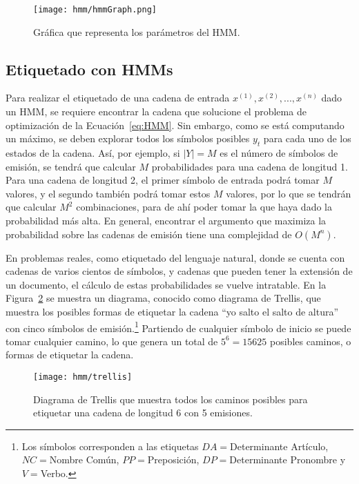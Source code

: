 \begin{figure}
 \centering
 \texttt{[image: hmm/hmmGraph.png]}
 \caption{Gráfica que representa los parámetros del HMM.}\label{Fig:hmmGraph}
\end{figure}





\subsection{Etiquetado con HMMs}

Para realizar el etiquetado de una cadena de entrada $x^{(1)}, x^{(2)},...,x^{(n)}$ dado un HMM, se requiere encontrar la cadena que solucione el problema de optimización de la Ecuación~\ref{eq:HMM}. Sin embargo, como se está computando un máximo, se deben explorar todos los símbolos posibles $y_t$ para cada uno de los estados de la cadena. Así, por ejemplo, si $|Y| = M$ es el número de símbolos de emisión, se tendrá que calcular $M$ probabilidades para una cadena de longitud 1. Para una cadena de longitud 2, el primer símbolo de entrada podrá tomar $M$ valores, y el segundo también podrá tomar estos $M$ valores, por lo que se tendrán que calcular $M^2$ combinaciones, para de ahí poder tomar la que haya dado la probabilidad más alta. En general, encontrar el argumento que maximiza la probabilidad sobre las cadenas de emisión tiene una complejidad de $O(M^n)$.

En problemas reales, como etiquetado del lenguaje natural, donde se cuenta con cadenas de varios cientos de símbolos, y cadenas que pueden tener la extensión de un documento, el cálculo de estas probabilidades se vuelve intratable. En la Figura~\ref{Fig:Trellis} se muestra un diagrama, conocido como diagrama de Trellis, que muestra los posibles formas de etiquetar la cadena ``yo salto el salto de altura'' con cinco símbolos de emisión.\footnote{Los símbolos corresponden a las etiquetas $DA=$Determinante Artículo, $NC=$Nombre Común, $PP=$Preposición, $DP=$Determinante Pronombre y $V=$Verbo.} Partiendo de cualquier símbolo de inicio se puede tomar cualquier camino, lo que genera un total de $5^6=15 625$ posibles caminos, o formas de etiquetar la cadena.


\begin{figure}
    \centering
    \texttt{[image: hmm/trellis]}
    \caption{Diagrama de Trellis que muestra todos los caminos posibles para etiquetar una cadena de longitud 6 con 5 emisiones.}
    \label{Fig:Trellis}
\end{figure}


